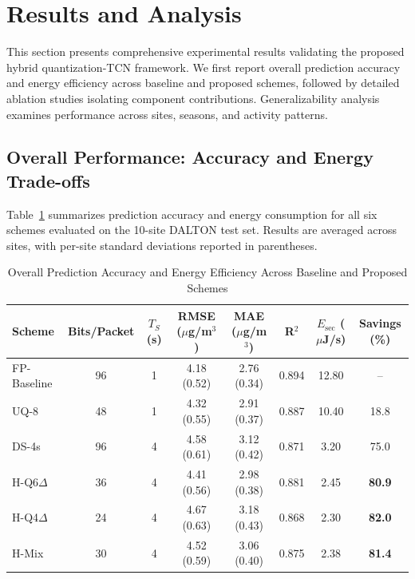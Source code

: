 \section{Results and Analysis}
\label{sec:results}

This section presents comprehensive experimental results validating the proposed hybrid quantization-TCN framework. We first report overall prediction accuracy and energy efficiency across baseline and proposed schemes, followed by detailed ablation studies isolating component contributions. Generalizability analysis examines performance across sites, seasons, and activity patterns.

\subsection{Overall Performance: Accuracy and Energy Trade-offs}

Table~\ref{tab:overall_performance} summarizes prediction accuracy and energy consumption for all six schemes evaluated on the 10-site DALTON test set. Results are averaged across sites, with per-site standard deviations reported in parentheses.

\begin{table}[t]
\centering
\caption{Overall Prediction Accuracy and Energy Efficiency Across Baseline and Proposed Schemes}
\label{tab:overall_performance}
\begin{tabular}{lccccccc}
\toprule
\textbf{Scheme} & \textbf{Bits/Packet} & \textbf{$T_S$ (s)} & \textbf{RMSE ($\mu$g/m$^3$)} & \textbf{MAE ($\mu$g/m$^3$)} & \textbf{R$^2$} & \textbf{$E_{\text{sec}}$ ($\mu$J/s)} & \textbf{Savings (\%)} \\
\midrule
FP-Baseline & 96 & 1 & 4.18 (0.52) & 2.76 (0.34) & 0.894 & 12.80 & -- \\
UQ-8 & 48 & 1 & 4.32 (0.55) & 2.91 (0.37) & 0.887 & 10.40 & 18.8 \\
DS-4s & 96 & 4 & 4.58 (0.61) & 3.12 (0.42) & 0.871 & 3.20 & 75.0 \\
\midrule
H-Q6$\Delta$ & 36 & 4 & 4.41 (0.56) & 2.98 (0.38) & 0.881 & 2.45 & \textbf{80.9} \\
H-Q4$\Delta$ & 24 & 4 & 4.67 (0.63) & 3.18 (0.43) & 0.868 & 2.30 & \textbf{82.0} \\
H-Mix & 30 & 4 & 4.52 (0.59) & 3.06 (0.40) & 0.875 & 2.38 & \textbf{81.4} \\
\bottomrule
\end{tabular}
\end{table}

